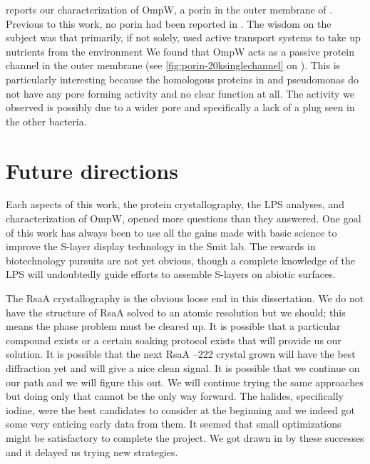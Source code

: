  reports our characterization of OmpW, a porin in the outer membrane of \caulobacter{}. Previous to this work, no porin had been reported in \caulobacter{}. The wisdom on the subject was that \caulobacter{} primarily, if not solely, used active transport systems to take up nutrients from the environment We found that OmpW acts as a passive protein channel in the outer membrane (see \cref{fig:porin-20ksinglechannel} on ). This is particularly interesting because the homologous proteins in \ecoli{} and \acl{pseudomonas} do not have any pore forming activity and no clear function at all.  The activity we observed is possibly due to a wider pore and specifically a lack of a plug seen in the other bacteria.  

\section{Future directions}\label{sec:future-directions}

Each aspects of this work, the protein crystallography, the \ac{LPS} analyses, and characterization of OmpW, opened more questions than they answered. One goal of this work has always been to use all the gains made with basic science to improve the \caulobacter{} \ac{S-layer} display technology in the Smit lab. The rewards in biotechnology pursuits are not yet obvious, though a complete knowledge of the \ac{LPS} will undoubtedly guide efforts to assemble \acp{S-layer} on abiotic surfaces.

The RsaA crystallography is the obvious loose end in this dissertation. We do not have the structure of RsaA solved to an atomic resolution but we should; this means the phase problem must be cleared up. It is possible that a particular compound exists or a certain soaking protocol exists that will provide us our solution. It is possible that the next RsaA --222 crystal grown will have the best diffraction yet and will give a nice clean signal. It is possible that we continue on our path and we will figure this out. We will continue trying the same approaches but doing only that cannot be the only way forward. The halides, specifically iodine, were the best candidates to consider at the beginning and we indeed got some very enticing early data from them. It seemed that small optimizations might be satisfactory to complete the project. We got drawn in by these successes and it delayed us trying new strategies.

